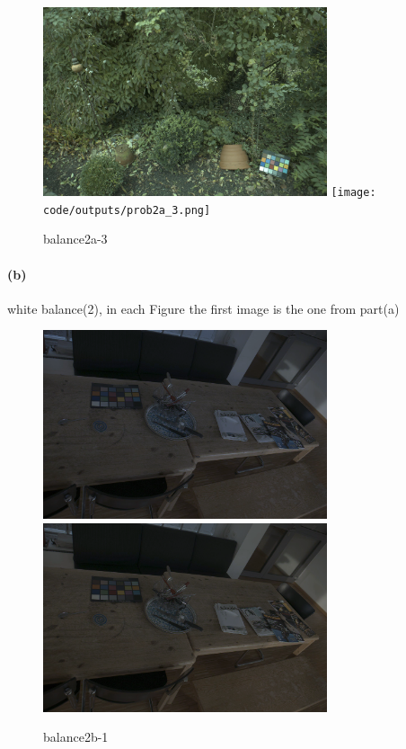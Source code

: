 \documentclass{article}
\newcommand{\spart}[1]{\paragraph{(#1)}}
\begin{document}
\begin{figure}[h!]
  \centering
  	\includegraphics[height=15em]{code/inputs/cc/ex3.jpg}
	\texttt{[image: code/outputs/prob2a\_3.png]}
	  \caption{balance2a-3}
\end{figure}
\par

\spart{b}
white balance(2), in each Figure the first image is the one from part(a)

\begin{figure}[h!]
  \centering
  	\includegraphics[height=15em]{code/outputs/prob2a_1.png}
	\includegraphics[height=15em]{code/outputs/prob2b_1.png}
	  \caption{balance2b-1}
\end{figure}
\end{document}
